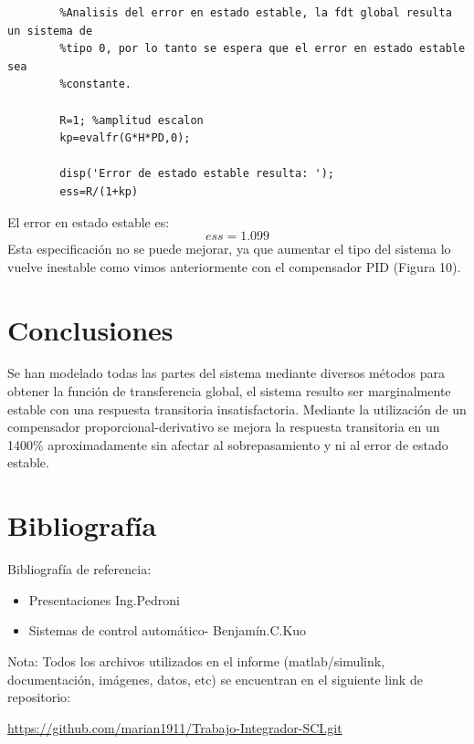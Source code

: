 \documentclass[12pt]{article}
\begin{document}
	\begin{lstlisting}
		%Analisis del error en estado estable, la fdt global resulta un sistema de
		%tipo 0, por lo tanto se espera que el error en estado estable sea
		%constante.
		
		R=1; %amplitud escalon
		kp=evalfr(G*H*PD,0);
		
		disp('Error de estado estable resulta: ');
		ess=R/(1+kp)
	\end{lstlisting}
	
	El error en estado estable es:
	\begin{equation}
		ess=1.099
	\end{equation}
	Esta especificación no se puede mejorar, ya que aumentar el tipo del sistema lo vuelve inestable como vimos anteriormente con el compensador PID (Figura 10).\newpage
	
\section{Conclusiones}
	Se han modelado todas las partes del sistema mediante diversos métodos para obtener la función de transferencia global, el sistema resulto ser marginalmente estable con una respuesta transitoria insatisfactoria. Mediante la utilización de un compensador proporcional-derivativo se mejora la respuesta transitoria en un 1400\% aproximadamente sin afectar al sobrepasamiento y ni al error de estado estable.

\section{Bibliografía}
	Bibliografía de referencia:
	\begin{itemize}
		\item Presentaciones Ing.Pedroni
		\item Sistemas de control automático- Benjamín.C.Kuo
	\end{itemize}
	
	Nota: Todos los archivos utilizados en el informe (matlab/simulink, documentación, imágenes, datos, etc) se encuentran en el siguiente link de repositorio:\newline
	
	\url{https://github.com/marian1911/Trabajo-Integrador-SCI.git}
	 
\end{document}
